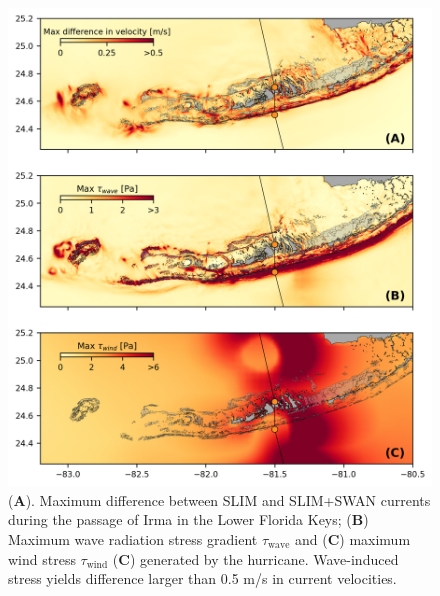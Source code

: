 \documentclass[preprint,12pt,authoryear]{elsarticle}
\begin{document}
\begin{figure}
    \centering
    \includegraphics[width=\textwidth]{fig/max_diff_reefs.png}
    \caption{(\textbf{A}). Maximum difference between SLIM and SLIM+SWAN currents during the passage of Irma in the Lower Florida Keys; (\textbf{B}) Maximum wave radiation stress gradient {\boldmath$\tau$}$_\text{wave}$ and (\textbf{C}) maximum wind stress {\boldmath$\tau$}$_\text{wind}$ (\textbf{C}) generated by the hurricane. Wave-induced stress yields difference larger than 0.5 m/s in current velocities.}
    \label{fig:diff}
\end{figure}
\end{document}
